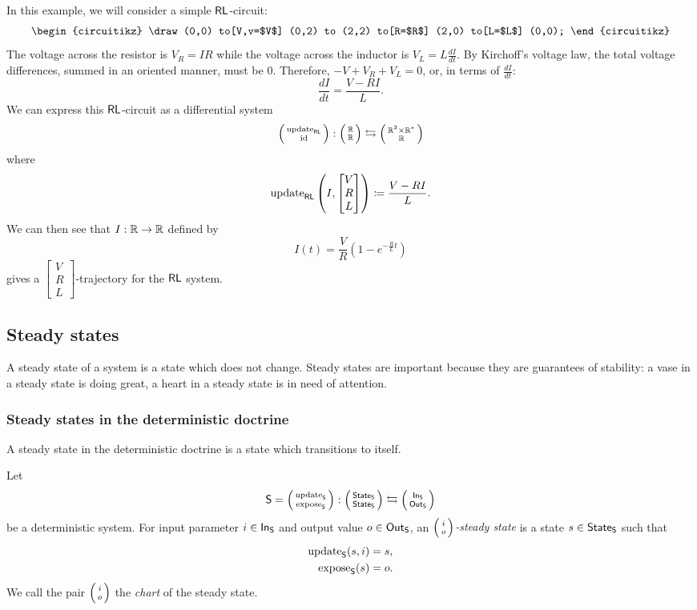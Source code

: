 \documentclass[DynamicalBook]{subfiles}
\begin{document}
\begin{example}\label{ex.RL_circuit_trajectory}
  In this example, we will consider a simple $\mathsf{RL}$-circuit:
  \[
    \begin{circuitikz}
      \draw (0,0)
      to[V,v=$V$] (0,2) %
      to (2,2)
      to[R=$R$] (2,0) %
      to[L=$L$] (0,0);
    \end{circuitikz}
  \]
  The voltage across the resistor is $V_R = IR$ while the 
  voltage across the inductor is $V_L = L \frac{dI}{dt}$. By Kirchoff's voltage
  law, the total voltage differences, summed in an oriented manner, must be $0$.
  Therefore, $-V + V_R + V_L = 0$, or, in terms of $\frac{dI}{dt}$:
  \[
\frac{dI}{dt} = \frac{V - RI}{L}.
  \]
  We can express this $\mathsf{RL}$-circuit as a differential system
  \[
\lens{\update{RL}}{\id} : \lens{\rr}{\rr} \fromto \lens{\rr^2 \times \rr^{\ast}}{\rr}
  \]
  where
  \[
\mathrm{update}_{\mathsf{RL}}\left( I, \begin{bmatrix} V \\ R \\ L \end{bmatrix} \right) \coloneqq
\frac{V - RI}{L}.
  \]
  We can then see that $I : \mathbb{R} \to \mathbb{R}$ defined by
  $$I(t) = \frac{V}{R}(1 - e^{-\frac{R}{L}t})$$
  gives a $\begin{bmatrix}V \\ R \\ L \end{bmatrix}$-trajectory for the
  $\mathsf{RL}$ system. 
\end{example}

\subsection{Steady states}

A steady state of a system is a state which does not change. Steady states are
important because they are guarantees of stability: a vase in a steady state is doing great, a heart in a steady state is in need of attention.

\subsubsection{Steady states in the deterministic doctrine}

A steady state in the deterministic doctrine is a state which transitions to itself.

\begin{definition}\label{def.steady_state_discrete}
 Let $$\Sys{S} = \lens{\update{S}}{\expose{S}} : \lens{\State{S}}{\State{S}}
 \leftrightarrows \lens{\In{S}}{\Out{S}}$$
 be a deterministic system. For input parameter $i \in \mathsf{In}_{\mathsf{S}}$ and output value
 $o \in \mathsf{Out}_{\mathsf{S}}$, an \emph{$\lens{i}{o}$-steady state} is a state $s \in \mathsf{State}_{\mathsf{S}}$
 such that
 \begin{align*}
   \mathrm{update}_{\mathsf{S}}(s, i) &= s, \\
   \mathrm{expose}_{\mathsf{S}}(s) &= o.
 \end{align*}
 We call the pair $\lens{i}{o}$ the \emph{chart} of the steady state.
\end{definition}
\end{document}

